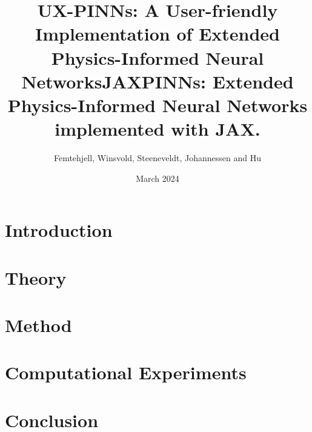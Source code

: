 \documentclass[aps,rmp,reprint,amsmath,amssymb,longbibliography,twocolumn,floatfix]{revtex4-1}
\begin{document}

\title{UX-PINNs: A User-friendly Implementation of Extended Physics-Informed Neural Networks}
\title{JAXPINNs: Extended Physics-Informed Neural Networks implemented with JAX.}

\author{Femtehjell, Winsvold, Steeneveldt, Johannessen and Hu}
\date{March 2024}


\begin{abstract}

\end{abstract}

\maketitle

\tableofcontents

\section{Introduction}
\label{sec:introduction}

\section{Theory}
\label{sec:theory}

\section{Method}
\label{sec:method}

\section{Computational Experiments}
\label{sec:compexp}

\section{Conclusion}
\label{sec:conclusion}


\appendix

\end{document}
